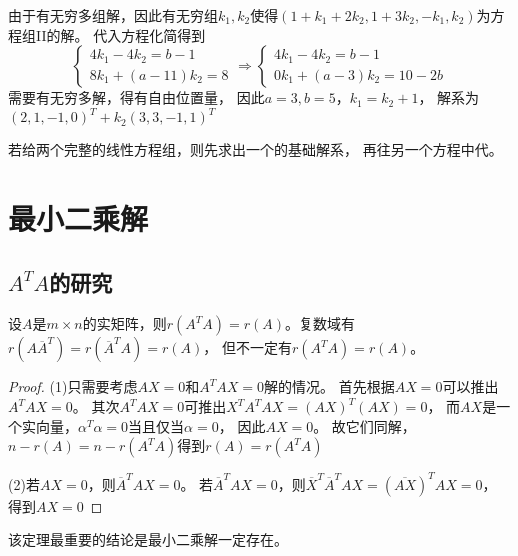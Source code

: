 \begin{solution}
  由于有无穷多组解，因此有无穷组$k_1,k_2$使得$(1+k_1+2k_2,1+3k_2,-k_1,k_2)$为方程组II的解。
  代入方程化简得到
  \begin{equation*}
    \begin{cases}
      4k_1 - 4k_2 = b-1\\
      8k_1+(a-11)k_2 = 8
    \end{cases} \Rightarrow
    \begin{cases}
      4k_1 - 4k_2 = b-1\\
      0k_1 + (a - 3)k_2 = 10-2b
    \end{cases}
  \end{equation*}
  需要有无穷多解，得有自由位置量，
  因此$a = 3, b = 5$，$k_1 = k_2 + 1$，
  解系为$(2,1,-1,0)^T + k_2(3,3,-1,1)^T$
\end{solution}

\begin{note}
  若给两个完整的线性方程组，则先求出一个的基础解系，
  再往另一个方程中代。
\end{note}



\section{最小二乘解}

\subsection{$A^TA$的研究}

\begin{theorem}[$A^TA$与$A$的秩]
  设$A$是$m \times n$的实矩阵，则$r(A^TA) = r(A)$。复数域有$r(A\overline{A}^T) = r(\overline{A}^TA) = r(A)$，
  但不一定有$r(A^TA) = r(A)$。
\end{theorem}

\begin{proof}
  (1)只需要考虑$AX = 0$和$A^TAX = 0$解的情况。
  首先根据$AX = 0$可以推出$A^TAX = 0$。
  其次$A^TAX = 0$可推出$X^TA^TAX = (AX)^T(AX) = 0$，
  而$AX$是一个实向量，$\alpha^T\alpha = 0$当且仅当$\alpha = 0$，
  因此$AX = 0$。
  故它们同解，$n - r(A) = n - r(A^TA)$得到$r(A) = r(A^TA)$

  (2)若$AX = 0$，则$\overline{A}^T AX = 0$。
  若$\overline{A}^TAX = 0$，则$\overline{X}^T\overline{A}^TAX = (\overline{AX})^T AX = 0 $，
  得到$AX = 0$
\end{proof}

\begin{note}
  该定理最重要的结论是最小二乘解一定存在。
\end{note}

